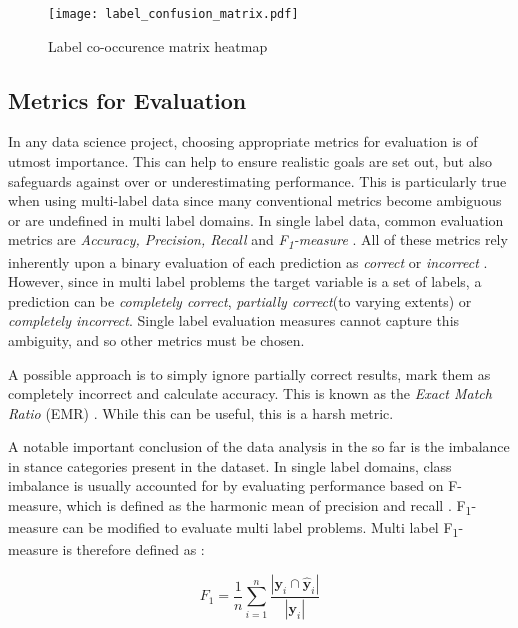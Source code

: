 \documentclass[Dissertation.tex]{subfiles}
\begin{document}
\begin{figure}
	\centering
	\hspace*{1em}
	\texttt{[image: label\_confusion\_matrix.pdf]}
	\caption{Label co-occurence matrix heatmap}
	\label{fig:labCoOc}
\end{figure}




\subsection{Metrics for Evaluation}
In any data science project, choosing appropriate metrics for evaluation is of utmost importance. This can help to ensure realistic goals are set out, but also  safeguards against over or underestimating performance. This is particularly true when using multi-label data since many conventional metrics become ambiguous or are undefined in multi label domains. In single label data, common evaluation metrics are \textit{Accuracy, Precision, Recall} and \textit{F\textsubscript{1}-measure} \cite{sorowerLiteratureSurveyAlgorithms2018}. All of these metrics rely inherently upon a binary evaluation of each prediction as \textit{correct} or \textit{incorrect} \cite{sorowerLiteratureSurveyAlgorithms2018}. However, since in multi label problems the target variable is a set of labels, a prediction can be \textit{completely correct}, \textit{partially correct}(to varying extents) or \textit{completely incorrect}. Single label evaluation measures cannot capture this ambiguity, and so other metrics must be chosen.

A possible approach is to simply ignore partially correct results, mark them as completely incorrect and calculate accuracy. This is known as the \textit{Exact Match Ratio} (EMR) \cite{sorowerLiteratureSurveyAlgorithms2018}. While this can be useful, this is a harsh metric.

A notable important conclusion of the data analysis in the so far is the imbalance in stance categories present in the dataset. In single label domains, class imbalance is usually accounted for by evaluating performance based on F-measure, which is defined as the harmonic mean of precision and recall \cite{sorowerLiteratureSurveyAlgorithms2018}. F\textsubscript{1}-measure can be modified to evaluate multi label problems. Multi label F\textsubscript{1}-measure is therefore defined as \cite{sorowerLiteratureSurveyAlgorithms2018}:

\[ F_1 = \frac{1}{n}\sum_{i=1}^{n}\frac{|\mathbf{y}_i \cap \mathbf{\hat{y}}_i|}{|\mathbf{y}_i|}\] 
\end{document}
